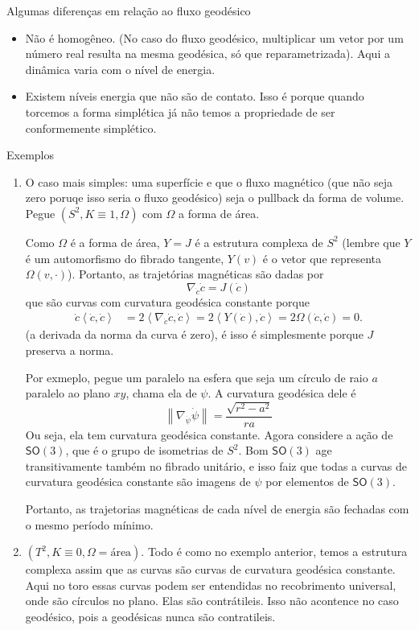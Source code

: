 \begin{thing4}{Algumas diferenças em relação ao fluxo geodésico}\leavevmode
	\begin{itemize}
	\item Não é homogêneo. (No caso do fluxo geodésico, multiplicar um vetor por um número real resulta na mesma geodésica, só que reparametrizada). Aqui a dinâmica varia com o nível de energia.
	\item Existem níveis energia que não são de contato. Isso é porque quando torcemos a forma simplética já não temos a propriedade de ser conformemente simplético.
	\end{itemize}
\end{thing4}

\begin{thing4}{Exemplos}\leavevmode
\begin{enumerate}
\item O caso mais simples: uma  superfície e que o fluxo magnético (que não seja zero poruqe isso seria o fluxo geodésico) seja o pullback da forma de volume. Pegue $(S^2,K\equiv 1, \Omega)$ com $\Omega$ a forma de área.

Como $\Omega$ é a forma de área, $Y=J$  é a estrutura complexa de $S^2$ (lembre que $Y$ é um automorfismo do fibrado tangente, $Y(v)$  é o vetor que representa $\Omega(v,\cdot)$). Portanto, as trajetórias magnéticas são dadas por 
\[\nabla_{\dot c}\dot c=J(\dot c)\]
que são curvas com curvatura geodésica constante porque
\begin{align*}
\dot c\left<\dot c, \dot c\right>&=2 \left<\nabla_{\dot c}\dot c, \dot c\right>=2\left<Y(\dot c),\dot c\right>=2 \Omega(\dot c, \dot c)=0.
\end{align*}
(a derivada da norma da curva é zero), é isso é simplesmente porque $J$ preserva a norma.

Por exmeplo, pegue um paralelo na esfera que seja um círculo de raio $a$ paralelo ao plano $xy$, chama ela de  $\psi$. A curvatura geodésica dele é 
\[\left\| \nabla_{\dot \psi}\dot \psi\right\|=\frac{\sqrt{r^2-a^2} }{ra}\]
Ou seja, ela tem curvatura geodésica constante. Agora considere a ação de $\mathsf{SO}(3)$, que é o grupo de isometrias de $S^2$. Bom $\mathsf{SO}(3)$ age transitivamente também no fibrado unitário, e isso faiz que todas a curvas de curvatura geodésica constante são imagens de $\psi$ por elementos de $\mathsf{SO}(3)$.

Portanto, as trajetorias magnéticas de cada nível de energia são fechadas com o mesmo período mínimo.
\item $(T^2,K\equiv 0,\Omega=\text{área})$.
Todo é como no exemplo anterior, temos a estrutura complexa assim que as curvas são curvas de curvatura geodésica constante. Aqui no toro essas curvas podem ser entendidas no recobrimento universal, onde são círculos no plano. Elas são contrátileis. Isso não acontence no caso geodésico, pois a geodésicas nunca são contratileis.


\end{enumerate}
\end{thing4}
